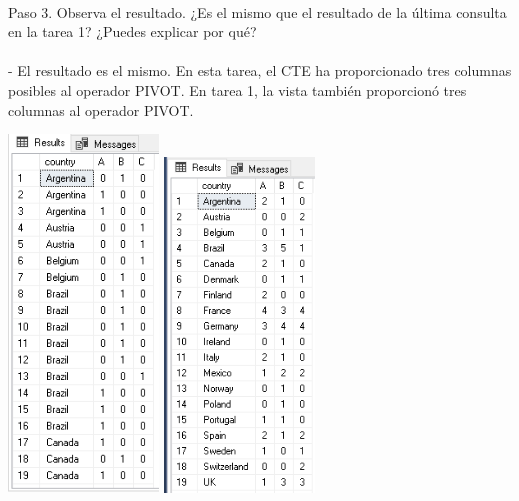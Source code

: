 \begin{flushleft}
\textbf{}\\
\textbf{}\\
\textbf{}\\
\textbf{}\\
\textbf{}\\
\textbf{}\\
Paso 3. Observa el resultado. ¿Es el mismo que el resultado de la última consulta en la tarea 1? ¿Puedes explicar por qué? \\
\textbf{}\\
- El resultado es el mismo. En esta tarea, el CTE ha proporcionado tres columnas posibles al operador PIVOT. En tarea 1, la vista también proporcionó tres columnas al operador PIVOT.
\textbf{}\\
\begin{center}
	\includegraphics[width=4cm]{./Imagenes/3img3} \includegraphics[width=4cm]{./Imagenes/3img31} 
	\end{center}


\end{flushleft}

